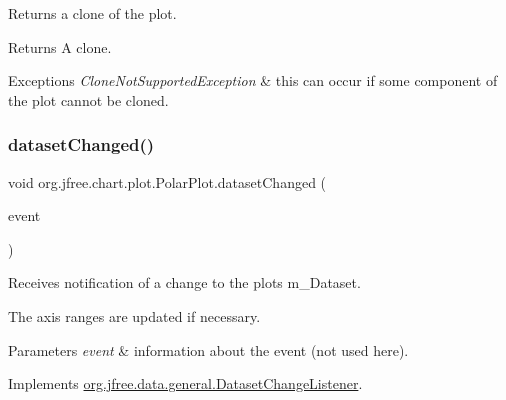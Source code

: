 Returns a clone of the plot.

\begin{DoxyReturn}{Returns}
A clone.
\end{DoxyReturn}

\begin{DoxyExceptions}{Exceptions}
{\em Clone\+Not\+Supported\+Exception} & this can occur if some component of the plot cannot be cloned. \\
\hline
\end{DoxyExceptions}
\mbox{\label{classorg_1_1jfree_1_1chart_1_1plot_1_1_polar_plot_a8881e298d2cedacb87d1137c6dcc2c50}} 
\subsubsection{\texorpdfstring{dataset\+Changed()}{datasetChanged()}}
{\footnotesize\ttfamily void org.\+jfree.\+chart.\+plot.\+Polar\+Plot.\+dataset\+Changed (\begin{DoxyParamCaption}\item[{\mbox{\hyperlink{classorg_1_1jfree_1_1data_1_1general_1_1_dataset_change_event}{Dataset\+Change\+Event}}}]{event }\end{DoxyParamCaption})}

Receives notification of a change to the plot\textquotesingle{}s m\+\_\+\+Dataset. 

The axis ranges are updated if necessary.


\begin{DoxyParams}{Parameters}
{\em event} & information about the event (not used here). \\
\hline
\end{DoxyParams}


Implements \mbox{\hyperlink{interfaceorg_1_1jfree_1_1data_1_1general_1_1_dataset_change_listener_a26ca53969f0dfa539f52e846a3cd72fe}{org.\+jfree.\+data.\+general.\+Dataset\+Change\+Listener}}.

\mbox{\label{classorg_1_1jfree_1_1chart_1_1plot_1_1_polar_plot_a260ecaf3b71bceb0a45da065c1202f37}} 
